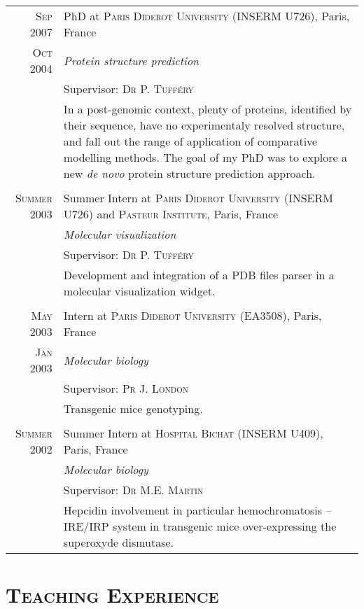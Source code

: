 \documentclass[a4paper,10pt]{article}
\begin{document}
\begin{longtable}{r|p{11cm}}
\clearpage

  \textsc{Sep 2007} & PhD at \textsc{Paris Diderot University} (INSERM U726), Paris, France \\
  \textsc{Oct 2004} & \emph{Protein structure prediction}\\
  & Supervisor: \textsc{Dr P. Tufféry}\\
  & \footnotesize{In a post-genomic context, plenty of proteins, identified by their sequence, have no experimentaly resolved structure, and fall out the range of application of comparative modelling methods. The goal of my PhD was to explore a new \textit{de novo} protein structure prediction approach.}\\
  \multicolumn{2}{c}{} \\

  \textsc{Summer 2003} & Summer Intern at \textsc{Paris Diderot University} (INSERM U726) and \textsc{Pasteur Institute}, Paris, France\\
  & \emph{Molecular visualization}\\
  & Supervisor: \textsc{Dr P. Tufféry}\\
  & \footnotesize{Development and integration of a PDB files parser in a molecular visualization widget.}\\
  \multicolumn{2}{c}{} \\

  \textsc{May 2003} & Intern at \textsc{Paris Diderot University} (EA3508), Paris, France\\
  \textsc{Jan 2003} & \emph{Molecular biology}\\
  & Supervisor: \textsc{Pr J. London}\\
  & \footnotesize{Transgenic mice genotyping.}\\
  \multicolumn{2}{c}{} \\

  \textsc{Summer 2002} & Summer Intern at \textsc{Hospital Bichat} (INSERM U409), Paris, France\\
  & \emph{Molecular biology}\\
  & Supervisor: \textsc{Dr M.E. Martin}\\
  & \footnotesize{Hepcidin involvement in particular hemochromatosis -- IRE/IRP system in transgenic mice over-expressing the superoxyde dismutase.}\\

\end{longtable}

\section{\textsc{Teaching Experience}}
\end{document}
